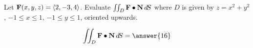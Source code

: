 \documentclass{ximera}
\author{David Guichard \and Neal Koblitz \and H. Jerome Keisler \and Albert Scheller \and Barry Balof \and Mike Wills \and Matthew Carr}
\begin{document}
\begin{exercise}




Let $\mathbf{F}(x,y,z)=\left\langle 2,-3,4\right\rangle$. Evaluate $\iint_{D}\mathbf{F}\bullet\mathbf{N}\mathop{}\!d\! S$ where $D$ is given by $z=x^2+y^2$, $-1\le x\le 1$, $-1\le y\le 1$, oriented upwards.

\begin{prompt}
\[
\iint_{D}\vec{F}\dotp\vec{N}\d S=\answer{16}
\]
\end{prompt}


\end{exercise}
\end{document}
